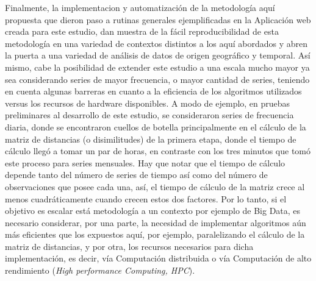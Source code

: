\documentclass[12pt,oneside]{book}\usepackage[]{graphicx}\usepackage[]{color}
\theoremstyle{definition} %
\begin{document}
Finalmente, la implementacion y automatización de la metodología aquí propuesta que dieron paso a rutinas generales ejemplificadas en la Aplicación web creada para este estudio, dan muestra de la fácil reproducibilidad de esta metodología en una variedad de contextos distintos a los aquí abordados y abren la puerta a una variedad de análisis de datos de origen geográfico y temporal. 
Así mismo, cabe la posibilidad de extender este estudio a una escala mucho mayor ya sea considerando series de mayor frecuencia, o mayor cantidad de series, teniendo en cuenta algunas barreras en cuanto a la eficiencia de los algoritmos utilizados versus los recursos de hardware disponibles. A modo de ejemplo, en pruebas preliminares al desarrollo de este estudio, se consideraron series de frecuencia diaria, donde se encontraron cuellos de botella principalmente en el cálculo de la matriz de distancias (o disimilitudes) de la primera etapa, donde el tiempo de cálculo llegó a tomar un par de horas, en contraste con los tres minutos que tomó este proceso para series mensuales. Hay que notar que el tiempo de cálculo depende tanto del número de series de tiempo así como del número de observaciones que posee cada una, así, el tiempo de cálculo de la matriz crece al menos cuadráticamente cuando crecen estos dos factores. Por lo tanto, si el objetivo es escalar está metodología a un contexto por ejemplo de Big Data, es necesario considerar, por una parte, la necesidad de implementar algoritmos aún más eficientes que los expuestos aquí, por ejemplo, paralelizando el cálculo de la matriz de distancias, y por otra, los recursos necesarios para dicha implementación, es decir, vía Computación distribuida o vía Computación de alto rendimiento (\textit{High performance Computing, HPC}).


\end{document}
